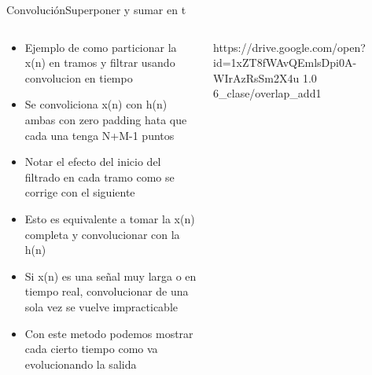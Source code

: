 \begin{frame}[t]{Convolución}{Superponer y sumar en t}
   \begin{columns}[t]
      \tiny
      \begin{column}{.4\textwidth}
         \begin{itemize}
            \item{Ejemplo de como particionar la x(n) en tramos y filtrar usando convolucion en tiempo }
            \item{Se convoliciona x(n) con h(n) ambas con zero padding hata que cada una tenga N+M-1 puntos}
            \item{Notar el efecto del inicio del filtrado en cada tramo como se corrige con el siguiente}
            \item{Esto es equivalente a tomar la x(n) completa y convolucionar con la h(n)}
            \item{Si x(n) es una señal muy larga o en tiempo real, convolucionar de una sola vez se vuelve impracticable}
            \item{Con este metodo podemos mostrar cada cierto tiempo como va evolucionando la salida}
         \end{itemize}
      \end{column}
      \hspace{2pt}
      \vrule
      \hspace{2pt}
      \begin{column}{.6\textwidth}
         {https://drive.google.com/open?id=1xZT8fWAvQEmlsDpi0A-WIrAzRsSm2X4u}
         {1.0}
         {6_clase/overlap_add1}
      \end{column}
      \hspace{2pt}
   \end{columns}
   \vfill
\end{frame}
